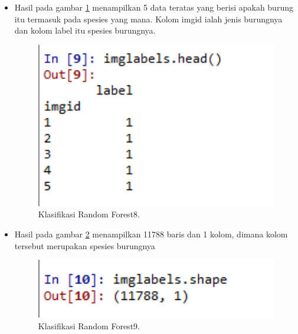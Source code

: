 \begin{enumerate}
\begin{itemize}
\item Hasil pada gambar \ref{rons8} menampilkan 5 data teratas yang berisi apakah burung itu termasuk pada spesies yang mana. Kolom imgid ialah jenis burungnya dan kolom label itu spesies burungnya.
 		\begin{figure}[ht]
		\centerline{\includegraphics[width=1\textwidth]{figures/im/rons8.png}}
		\caption{Klasifikasi Random Forest8.}
		\label{rons8}
		\end{figure}

\item Hasil pada gambar \ref{rons9} menampilkan 11788 baris dan 1 kolom, dimana kolom tersebut merupakan spesies burungnya
 		\begin{figure}[ht]
		\centerline{\includegraphics[width=1\textwidth]{figures/im/rons9.png}}
		\caption{Klasifikasi Random Forest9.}
		\label{rons9}
		\end{figure}


\end{itemize}
\end{enumerate}
